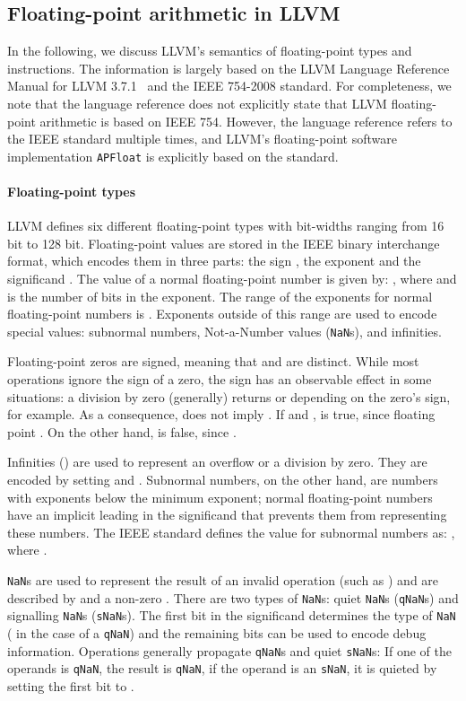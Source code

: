\documentclass[preprint, numbers]{sigplanconf}
\begin{document}
\subsection{Floating-point arithmetic in LLVM} \label{sec:fpllvm}

In the following, we discuss LLVM's semantics of floating-point types and
instructions. The information is largely based on the LLVM Language Reference
Manual for LLVM 3.7.1~\cite{llvm-lang-ref} and the IEEE 754-2008 standard. For
completeness, we note that the language reference does not explicitly state
that LLVM floating-point arithmetic is based on IEEE 754. However, the language
reference refers to the IEEE standard multiple times, and LLVM's floating-point software
implementation \texttt{APFloat} is explicitly based on the standard.

\paragraph{Floating-point types} LLVM defines six different floating-point
types with bit-widths ranging from 16 bit to 128 bit. Floating-point values are
stored in the IEEE binary interchange format, which encodes them in three
parts: the sign , the exponent  and the significand . The value of a
normal floating-point number is given by: , where  and  is the number of
bits in the exponent. The range of the exponents for normal floating-point
numbers is . Exponents outside of this range are used to encode
special values: subnormal numbers, Not-a-Number values (\texttt{NaN}s), and
infinities.

Floating-point zeros are signed, meaning that  and  are distinct.
While most operations ignore the sign of a zero, the sign has an observable
effect in some situations: a division by zero (generally) returns  or
 depending on the zero's sign, for example. As a consequence, 
does not imply . If  and ,  is
true, since floating point . On the other hand,  is false, since .

Infinities () are used to represent an overflow or a division by
zero. They are encoded by setting  and . Subnormal numbers,
on the other hand, are numbers with exponents below the minimum exponent;
normal floating-point numbers have an implicit leading  in the significand
that prevents them from representing these numbers.  The IEEE standard defines
the value for subnormal numbers as: , where .

\texttt{NaN}s are used to represent the result of an invalid operation (such as
) and are described by  and a non-zero .
There are two types of \texttt{NaN}s: quiet \texttt{NaN}s (\texttt{qNaN}s) and
signalling \texttt{NaN}s (\texttt{sNaN}s). The first bit in the significand
determines the type of \texttt{NaN} ( in the case of a \texttt{qNaN}) and
the remaining bits can be used to encode debug information. Operations
generally propagate \texttt{qNaN}s and quiet \texttt{sNaN}s: If one of the
operands is \texttt{qNaN}, the result is \texttt{qNaN}, if the operand is an
\texttt{sNaN}, it is quieted by setting the first bit to .
\end{document}
